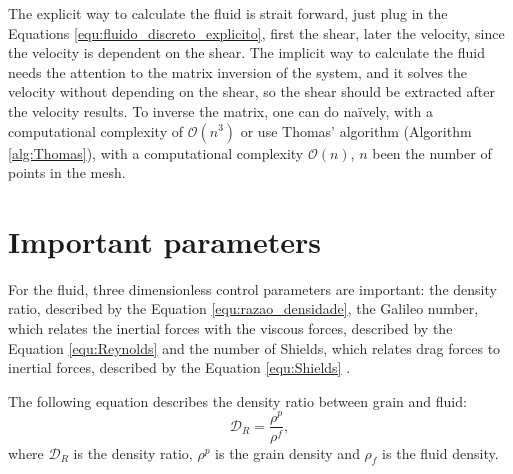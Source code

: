 

    The explicit way to calculate the fluid is strait forward, just plug in the Equations \ref{equ:fluido_discreto_explicito}, first the shear, later the velocity, since the velocity is dependent on the shear. The implicit way to calculate the fluid needs the attention to the matrix inversion of the system, and it solves the velocity without depending on the shear, so the shear should be extracted after the velocity results. To inverse the matrix, one can do naïvely, with a computational complexity of $\mathcal{O}(n^3)$ or use Thomas' algorithm (Algorithm \ref{alg:Thomas}), with a computational complexity $\mathcal{O}(n)$, $n$ been the number of points in the mesh.



\section{Important parameters}
    For the fluid, three dimensionless control parameters are important: the density ratio, described by the Equation \ref{equ:razao_densidade}, the Galileo number, which relates the inertial forces with the viscous forces, described by the Equation \ref{equ:Reynolds} and the number of Shields, which relates drag forces to inertial forces, described by the Equation \ref{equ:Shields} \cite{Numerical_simulation_of_turbulent_sediment_transport}.

    The following equation describes the density ratio between grain and fluid:
\begin{equation}
    \label{equ:razao_densidade}
    \mathcal{D}_{R} = \frac{\rho^{p}}{\rho^{f}},
\end{equation}
where $\mathcal{D}_{R}$ is the density ratio, $\rho^{p}$ is the grain density and $\rho_f$ is the fluid density.

